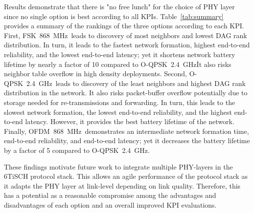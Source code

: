 \documentclass[journal]{IEEEtran}
\newcommand{\fsk}          {FSK~868~MHz}
\newcommand{\oqpsk}        {O-QPSK~2.4~GHz}
\newcommand{\ofdm}         {OFDM~868~MHz}
\begin{document}

Results demonstrate that there is "no free lunch" for the choice of PHY layer since no single option is best according to all KPIs.
Table~\ref{tab:summary} provides a summary of the rankings of the three options according to each KPI.
First, \fsk\ leads to discovery of most neighbors and lowest DAG rank distribution.
In turn, it leads to the fastest network formation, highest end-to-end reliability, and the lowest end-to-end latency; yet it shortens network battery lifetime by nearly a factor of 10 compared to \oqpsk\. 
It also risks neighbor table overflow in high density deployments.
Second, \oqpsk\ leads to discovery of the least neighbors and highest DAG rank distribution in the network.
It also risks packet-buffer overflow potentially due to storage needed for re-transmissions and forwarding.
In turn, this leads to the slowest network formation, the lowest end-to-end reliability, and the highest end-to-end latency.
However, it provides the best battery lifetime of the network. 
Finally, \ofdm\ demonstrates an intermediate network formation time, end-to-end reliability, and end-to-end latency; yet  it decreases the battery lifetime by a factor of 5 compared to \oqpsk.


These findings motivate future work to integrate multiple PHY-layers in the 6TiSCH protocol stack.
This allows an agile performance of the protocol stack as it adapts the PHY layer at link-level depending on link quality.
Therefore, this has a potential as a reasonable compromise among the advantages and disadvantages of each option and an overall improved KPI evaluations. 



\end{document}
